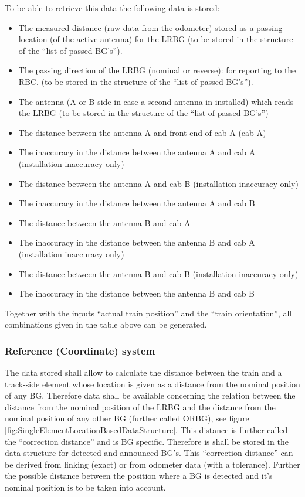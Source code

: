 To be able to retrieve this data the following data is stored:
\begin{itemize}
\item The measured distance (raw data from the odometer) stored as a passing location (of the active antenna) for the LRBG 
(to be stored in the structure of the “list of passed BG's”).
\item The passing direction of the LRBG (nominal or reverse): for reporting to the RBC.
(to be stored in the structure of the “list of passed BG's”).
\item The antenna (A or B side in case a second antenna in installed) which reads the LRBG 
(to be stored in the structure of the “list of passed BG's”)
\item The distance between the antenna A and front end of cab A (cab A)
\item The inaccuracy in the distance between the antenna A and cab A (installation inaccuracy only)
\item The distance between the antenna A and cab B (installation inaccuracy only)
\item The inaccuracy in the distance between the antenna A and cab B
\item The distance between the antenna B and cab A
\item The inaccuracy in the distance between the antenna B and cab A (installation inaccuracy only)
\item The distance between the antenna B and cab B (installation inaccuracy only)
\item The inaccuracy in the distance between the antenna B and cab B
\end{itemize}

Together with the inputs “actual train position” and the “train orientation”,  all combinations given in the table above can be generated.


\subsubsection{Reference (Coordinate) system}
The data stored shall allow to calculate the distance between the train and a track-side element whose location is given as a distance from the nominal position of any BG. Therefore data shall be available concerning the relation between the distance from the nominal position of the LRBG and the distance from the nominal position of any other BG (further called ORBG), see figure \ref{fig:SingleElementLocationBasedDataStructure}. This distance is further called the “correction distance” and is BG specific. Therefore is shall be stored in the data structure for detected and announced BG's.
This “correction distance” can be derived from linking (exact) or from odometer data (with a tolerance). Further the possible distance between the position where a BG is detected and it's nominal position is to be taken into account.

